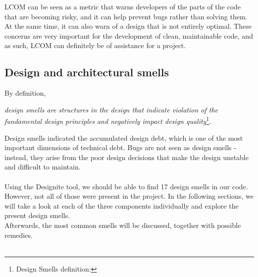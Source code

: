             LCOM can be seen as a metric that warns developers of the parts of the code that are becoming risky, and it can help prevent bugs rather than solving them. At the same time, it can also warn of a design that is not entirely optimal. These concerns are very important for the development of clean, maintainable code, and as such, LCOM can definitely be of assistance for a project. \\
    
            
    \subsection{Design and architectural smells}
        By definition, 
        \begin{adjustwidth}{1.5cm}{}
            \textit{design smells are structures in the design that indicate violation of the fundamental design principles and negatively impact design quality}\footnote{Design Smells definition: }.
        \end{adjustwidth}
        Design smells indicated the accumulated design debt, which is one of the most important dimensions of technical debt. Bugs are not seen as design smells - instead, they arise from the poor design decisions that make the design unstable and difficult to maintain.\\\\
        Using the Designite tool, we should be able to find 17 design smells in our code. However, not all of those were present in the project. In the following sections, we will take a look at each of the three components individually and explore the present design smells. \\
        Afterwards, the most common smells will be discussed, together with possible remedies.\\\\
        

